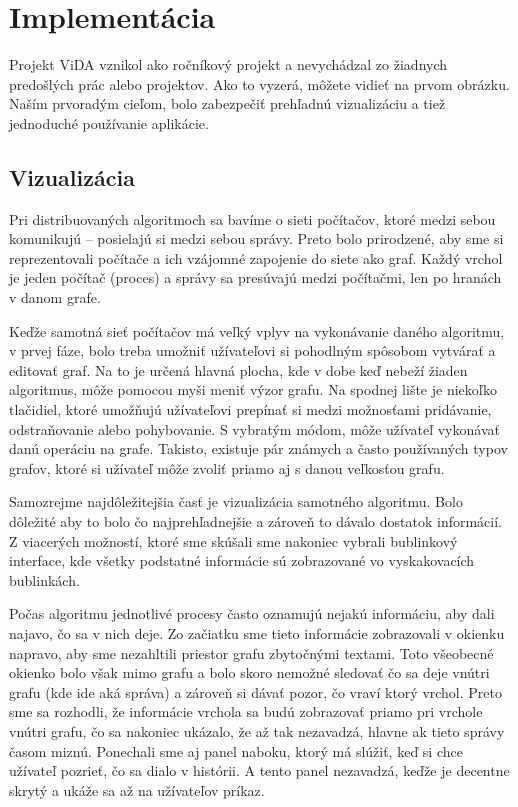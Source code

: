 \section{Implementácia}

Projekt ViDA vznikol ako ročníkový projekt a nevychádzal zo žiadnych predošlých prác alebo
projektov. Ako to vyzerá, môžete vidieť
na prvom obrázku. Naším prvoradým cieľom, bolo zabezpečiť prehľadnú vizualizáciu a tiež jednoduché
používanie aplikácie.

\subsection{Vizualizácia}

Pri distribuovaných algoritmoch sa bavíme o sieti počítačov, ktoré medzi sebou komunikujú --
posielajú si medzi sebou správy. Preto bolo prirodzené, aby sme si reprezentovali počítače a ich
vzájomné zapojenie do siete ako graf. Každý vrchol je jeden počítač (proces) a správy sa presúvajú
medzi počítačmi, len po hranách v danom grafe.

Keďže samotná sieť počítačov má veľký vplyv na vykonávanie daného algoritmu, v prvej fáze, bolo
treba umožniť užívateľovi si pohodlným spôsobom vytvárať a editovať graf. Na to je určená hlavná
plocha, kde v dobe keď nebeží žiaden algoritmus, môže pomocou myši meniť výzor grafu. Na spodnej
lište je niekoľko tlačidiel, ktoré umožňujú užívateľovi prepínať si medzi možnosťami pridávanie,
odstraňovanie alebo pohybovanie. S vybratým módom, môže užívateľ vykonávať danú operáciu na grafe.
Takisto, existuje pár známych a často používaných typov grafov, ktoré si užívateľ môže zvoliť priamo
aj s danou veľkosťou grafu.

Samozrejme najdôležitejšia časť je vizualizácia samotného algoritmu. Bolo dôležité aby to bolo čo
najprehľadnejšie a zároveň to dávalo dostatok informácií. Z viacerých možností, ktoré sme skúšali
sme nakoniec vybrali bublinkový interface, kde všetky podstatné informácie sú zobrazované vo
vyskakovacích bublinkách.

Počas algoritmu jednotlivé procesy často oznamujú nejakú informáciu, aby dali najavo, čo sa v nich
deje. Zo začiatku sme tieto informácie zobrazovali v okienku napravo, aby sme nezahltili priestor
grafu zbytočnými textami. Toto všeobecné okienko bolo však mimo grafu a bolo skoro nemožné sledovať
čo sa deje vnútri grafu (kde ide aká správa) a zároveň si dávať pozor, čo vraví ktorý vrchol. Preto
sme sa rozhodli, že informácie vrchola sa budú zobrazovať priamo pri vrchole vnútri grafu, čo sa
nakoniec ukázalo, že až tak nezavadzá, hlavne ak tieto správy časom miznú. Ponechali sme aj
panel naboku, ktorý má slúžiť, keď si chce užívateľ pozrieť, čo sa dialo v histórii. A tento panel
nezavadzá, keďže je decentne skrytý a ukáže sa až na užívateľov príkaz.

